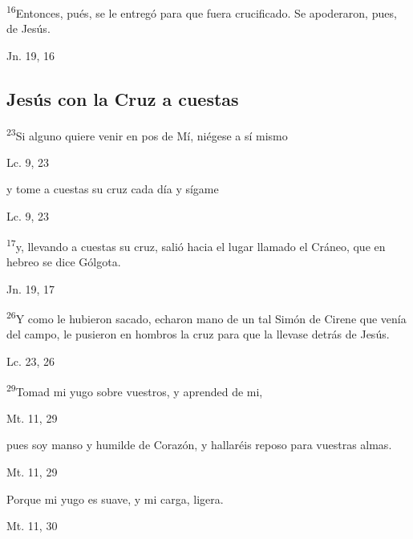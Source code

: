 \documentclass[a4paper,11pt]{article}
\begin{document}
      \textsuperscript{16}Entonces, pués, se le entregó para que fuera crucificado. Se apoderaron, pues, de Jesús.
      \begin{flushright}
        Jn. 19, 16
      \end{flushright}

    \subsection*{\hfil Jesús con la Cruz a cuestas \hfil}
      
      \textsuperscript{23}Si alguno quiere venir en pos de Mí, niégese a sí mismo
      \begin{flushright}
        Lc. 9, 23
      \end{flushright}

      y tome a cuestas su cruz cada día y sígame
      \begin{flushright}
        Lc. 9, 23
      \end{flushright}

      \textsuperscript{17}y, llevando a cuestas su cruz, salió hacia el lugar llamado el Cráneo, que en hebreo se dice Gólgota.
      \begin{flushright}
        Jn. 19, 17
      \end{flushright}

      \textsuperscript{26}Y como le hubieron sacado, echaron mano de un tal Simón de Cirene que venía del campo, le pusieron en hombros la cruz para que la llevase
      detrás de Jesús.
      \begin{flushright}
        Lc. 23, 26
      \end{flushright}

      \textsuperscript{29}Tomad mi yugo sobre vuestros, y aprended de mi, 
      \begin{flushright}
        Mt. 11, 29  
      \end{flushright}

      pues soy manso y humilde de Corazón, y hallaréis reposo para vuestras almas.
      \begin{flushright}
        Mt. 11, 29
      \end{flushright}

      Porque mi yugo es suave, y mi carga, ligera.
      \begin{flushright}
        Mt. 11, 30
      \end{flushright}
\end{document}
